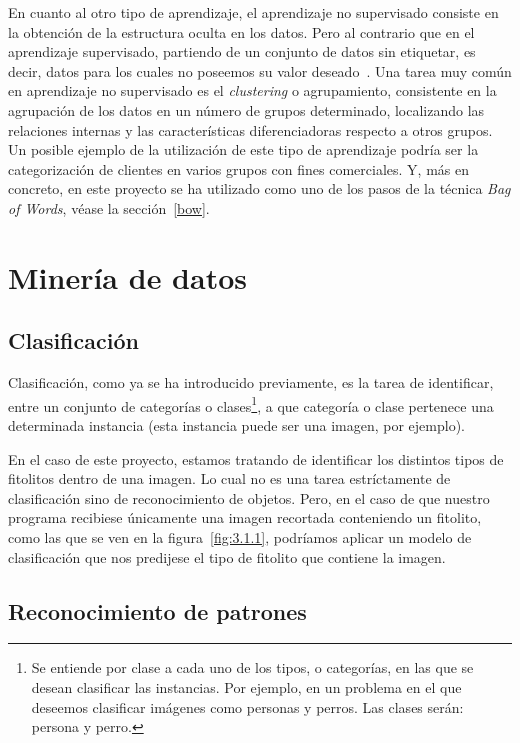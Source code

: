 En cuanto al otro tipo de aprendizaje, el aprendizaje no supervisado consiste en la obtención de la estructura oculta en los datos. Pero al contrario que en el aprendizaje supervisado, partiendo de un conjunto de datos sin etiquetar, es decir, datos para los cuales no poseemos su valor deseado~\cite{wiki:unsupervisedLearning}. Una tarea muy común en aprendizaje no supervisado es el \textit{clustering} o agrupamiento, consistente en la agrupación de los datos en un número de grupos determinado, localizando las relaciones internas y las características diferenciadoras respecto a otros grupos. Un posible ejemplo  de la utilización de este tipo de aprendizaje podría ser la categorización de clientes en varios grupos con fines comerciales. Y, más en concreto, en este proyecto se ha utilizado como uno de los pasos de la técnica \textit{Bag of Words}, véase la sección~\ref{bow}.

\section{Minería de datos}
\label{md}
\subsection{Clasificación}

Clasificación, como ya se ha introducido previamente, es la tarea de identificar, entre un conjunto de  categorías o clases\footnote{Se entiende por clase a cada uno de los tipos, o categorías, en las que se desean clasificar las instancias. Por ejemplo, en un problema en el que deseemos clasificar imágenes como personas y perros. Las clases serán: persona y perro.}, a que categoría o clase pertenece una determinada instancia (esta instancia puede ser una imagen, por ejemplo).

En el caso de este proyecto, estamos tratando de identificar los distintos tipos de fitolitos dentro de una imagen. Lo cual no es una tarea estríctamente de clasificación sino de reconocimiento de objetos. Pero, en el caso de que nuestro programa recibiese únicamente una imagen recortada conteniendo un fitolito, como las que se ven en la figura~\ref{fig:3.1.1}, podríamos aplicar un modelo de clasificación que nos predijese el tipo de fitolito que contiene la imagen.

\subsection{Reconocimiento de patrones}

